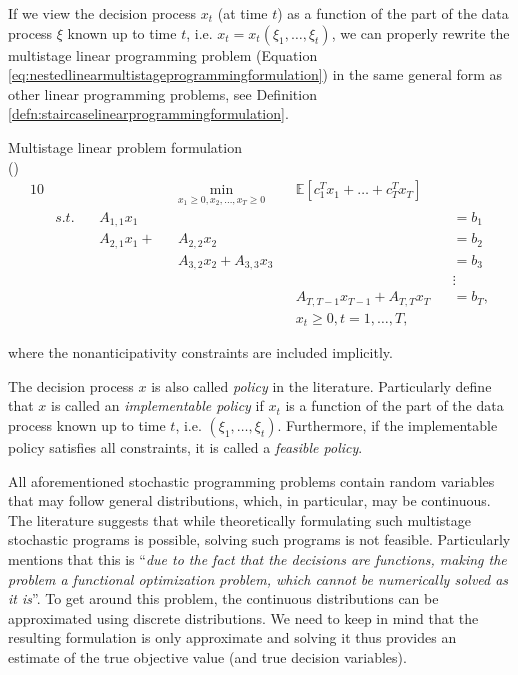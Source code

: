 If we view the decision process $x_t$ (at time $t$) as a function of the part of the data process $\xi$ known up to time $t$, i.e. $x_t=x_t(\xi_1,\dots,\xi_t)$, we can properly rewrite the multistage linear programming problem (Equation \ref{eq:nestedlinearmultistageprogrammingformulation}) in the same general form as other linear programming problems, see Definition \ref{defn:staircaselinearprogrammingformulation}.
\begin{defn}
{\normalfont Multistage linear problem formulation} 
\label{defn:staircaselinearprogrammingformulation} \\
{\normalfont (\cite[Ch. 1, p. 22]{stochasticprogrammingbible})}
\\
\footnotesize
\begin{alignat}{10}
\label{eq:staircaselinearprogrammingformulation}
& &&  && \underset{x_1 \geq 0, x_2,\dots,x_T {\geq} 0}{\mathrm{min}}  &&  \mathbb{E}\left[ c_1^Tx_1 + \dots +  c_T^Tx_T \right] && \\
& s.t. \, && A_{1,1}x_1 && && && {=} b_1 \nonumber \\
& && A_{2,1}x_1 +  && A_{2,2}x_2 && && {=} b_2 \nonumber \\
& && && A_{3,2}x_2  +  A_{3,3}x_3 && && {=} b_3 \nonumber \\
& && && && && \vdots \nonumber \\
& && && && A_{T,T-1}x_{T-1}  +  A_{T,T}x_T  && {=} b_T, \nonumber \\
& && && &&  x_t  \geq 0, t=1,\dots,T, &&  \nonumber
\end{alignat}
\normalsize
\end{defn}
\begin{flushleft}
where the nonanticipativity constraints are included implicitly.
\end{flushleft}
\begin{rem}
The decision process $x$ is also called \textit{policy} in the literature. Particularly \cite[p. 95, Definition 29]{stochasticprogrammingbible} define that $x$ is called an \textit{implementable policy} if $x_t$ is a function of the part of the data process known up to time $t$, i.e. $(\xi_1,\dots,\xi_t)$. Furthermore, if the implementable policy satisfies all constraints, it is called a \textit{feasible policy}.
\end{rem}

All aforementioned stochastic programming problems contain random variables that may follow general distributions, which, in particular, may be continuous. The literature suggests that while theoretically formulating such multistage stochastic programs is possible, solving such programs is not feasible. Particularly \cite{pflugscenariotreegeneration} mentions that this is “\textit{due to the fact that the decisions are functions, making the problem a functional optimization problem, which cannot be numerically solved as it is}”. To get around this problem, the continuous distributions can be approximated using discrete distributions. We need to keep in mind that the resulting formulation is only approximate and solving it thus provides an estimate of the true objective value (and true decision variables).
